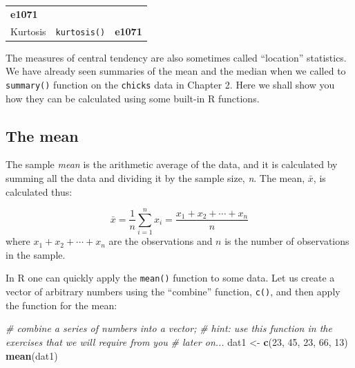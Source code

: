 \documentclass[english,10pt,a4paper,oneside]{book}
\newenvironment{Shaded}{\begin{snugshade}}{\end{snugshade}}
\newcommand{\KeywordTok}[1]{\textcolor[rgb]{0.13,0.29,0.53}{\textbf{#1}}}
\newcommand{\DecValTok}[1]{\textcolor[rgb]{0.00,0.00,0.81}{#1}}
\newcommand{\StringTok}[1]{\textcolor[rgb]{0.31,0.60,0.02}{#1}}
\newcommand{\CommentTok}[1]{\textcolor[rgb]{0.56,0.35,0.01}{\textit{#1}}}
\newcommand{\NormalTok}[1]{#1}
\theoremstyle{definition}
\theoremstyle{definition}
\theoremstyle{definition}
\theoremstyle{remark}
\begin{document}
\begin{longtable}[]{@{}lll@{}}
\begin{minipage}[t]{0.18\columnwidth}
\textbf{e1071}\strut
\end{minipage}\tabularnewline
\begin{minipage}[t]{0.25\columnwidth}\raggedright\strut
Kurtosis\strut
\end{minipage} & \begin{minipage}[t]{0.18\columnwidth}\raggedright\strut
\texttt{kurtosis()}\strut
\end{minipage} & \begin{minipage}[t]{0.18\columnwidth}\raggedright\strut
\textbf{e1071}\strut
\end{minipage}\tabularnewline
\bottomrule
\end{longtable}

The measures of central tendency are also sometimes called
\enquote{location} statistics. We have already seen summaries of the
mean and the median when we called to \texttt{summary()} function on the
\texttt{chicks} data in Chapter 2. Here we shall show you how they can
be calculated using some built-in R functions.

\subsection{The mean}\label{the-mean}

The sample \emph{mean} is the arithmetic average of the data, and it is
calculated by summing all the data and dividing it by the sample size,
\emph{n}. The mean, \(\bar{x}\), is calculated thus:

\[\bar{x} = \frac{1}{n}\sum_{i=1}^{n}x_{i} = \frac{x_{1} + x_{2} + \cdots + x_{n}}{n}\]
where \(x_{1} + x_{2} + \cdots + x_{n}\) are the observations and \(n\)
is the number of observations in the sample.

In R one can quickly apply the \texttt{mean()} function to some data.
Let us create a vector of arbitrary numbers using the \enquote{combine}
function, \texttt{c()}, and then apply the function for the mean:

\begin{Shaded}
\begin{Highlighting}[]
\CommentTok{# combine a series of numbers into a vector;}
\CommentTok{# hint: use this function in the exercises that we will require from you}
\CommentTok{# later on...}
\NormalTok{dat1 <-}\StringTok{ }\KeywordTok{c}\NormalTok{(}\DecValTok{23}\NormalTok{, }\DecValTok{45}\NormalTok{, }\DecValTok{23}\NormalTok{, }\DecValTok{66}\NormalTok{, }\DecValTok{13}\NormalTok{)}
\KeywordTok{mean}\NormalTok{(dat1)}
\end{Highlighting}
\end{Shaded}
\end{document}

